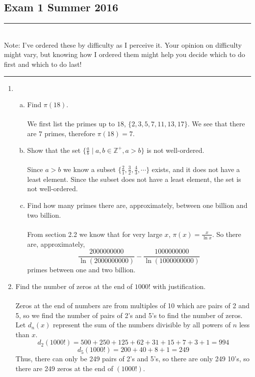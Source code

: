 \documentclass[class=article, crop=false]{standalone}
\def\integers{{\mathbb Z}}
\begin{document}
\subsection{Exam 1 Summer 2016}
\rule{\textwidth}{1pt}\\
Note: I've ordered these by difficulty as I perceive it. Your opinion on difficulty might vary,
but knowing how I ordered them might help you decide which to do first and which to do last!\\
\rule{\textwidth}{1pt}
\begin{enumerate}[1.]
	\item 
	\begin{enumerate}[(a)]
		\item Find $\pi(18)$.\\\\
		We first list the primes up to $18$, $\{2,3,5,7,11,13,17\}$. We see that there are $7$ primes,
		therefore $\pi(18)=7$.
		
		\item Show that the set $\{\frac{a}{b} \mid a,b\in\integers^+, a>b\}$ is not well-ordered.\\\\
		Since $a>b$ we know a subset 
		$\{\frac{2}{1}, \frac{3}{2}, \frac{4}{3},\cdots\}$ exists, and it does not have a least element.
		Since the subset does not have a least element, the set is not well-ordered.
		
		\item Find how many primes there are, approximately, between one billion and two billion.\\\\
		From section 2.2 we know that for very large $x$, $\pi(x)=\frac{x}{\ln x}$.
		So there are, approximately, 
		$$\frac{2000000000}{\ln(2000000000)} - \frac{1000000000}{\ln(1000000000)}$$
		primes between one and two billion.
	
	\end{enumerate}

	
	\item Find the number of zeros at the end of $1000!$ with justification.\\\\
	Zeros at the end of numbers are from multiples of 10 which are pairs of 2 and 5, so
  	we find the number of pairs of 2's and 5's to find the number of zeros. Let $d_n(x)$
  	represent the sum of the numbers divisible by all powers of $n$ less than $x$. 
  	$$d_2(1000!) = 500 + 250 + 125 + 62 + 31 + 15 + 7 + 3 + 1 = 994$$
  	$$d_5(1000!) = 200 + 40 + 8 + 1 = 249$$
  	Thus, there can only be 249 pairs of 2's and 5's, so there are only 249 
  	10's, so there are 249 zeros at the end of $(1000!)$.
	

\end{enumerate}
\end{document}
